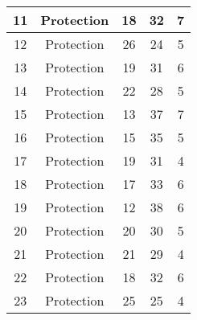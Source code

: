 \documentclass[results.tex]{subfiles}
\begin{document}
\begin{center}
\begin{tabular}{| c || c | c | c | c |}
            \hline
            11                      & Protection                   & 18                     & 32                      & 7                    \\
            \hline
            12                      & Protection                   & 26                     & 24                      & 5                    \\
            \hline
            13                      & Protection                   & 19                     & 31                      & 6                    \\
            \hline
            14                      & Protection                   & 22                     & 28                      & 5                    \\
            \hline
            15                      & Protection                   & 13                     & 37                      & 7                    \\
            \hline
            16                      & Protection                   & 15                     & 35                      & 5                    \\
            \hline
            17                      & Protection                   & 19                     & 31                      & 4                    \\
            \hline
            18                      & Protection                   & 17                     & 33                      & 6                    \\
            \hline
            19                      & Protection                   & 12                     & 38                      & 6                    \\
            \hline
            20                      & Protection                   & 20                     & 30                      & 5                    \\
            \hline
            21                      & Protection                   & 21                     & 29                      & 4                    \\
            \hline
            22                      & Protection                   & 18                     & 32                      & 6                    \\
            \hline
            23                      & Protection                   & 25                     & 25                      & 4                    \\

\end{tabular}
\end{center}
\end{document}
